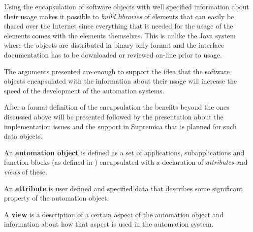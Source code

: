 Using the encapsulation of software objects with well
specified information about their usage makes it possible to
\textit{build libraries} of elements that can easily be
shared over the Internet since everything that is needed for
the usage of the elements comes with the elements
themselves. This is unlike the Java system where the objects
are distributed in binary only format and the interface
documentation has to be downloaded or reviewed on-line prior
to usage.

The arguments presented are enough to support the idea that
the software objects encapsulated with the information about
their usage will increase the speed of the development of
the automation systems. 

After a formal definition of the encapsulation the benefits
beyond the ones discussed above will be presented followed
by the presentation about the implementation issues and the
support in Supremica that is planned for such data objects.






An \textbf{automation object} is defined as a set of
applications, subapplications and function blocks (as
defined in \cite{iec:614991:2000}) encapsulated with a
declaration of \textit{attributes} and \textit{views} of
these.

An \textbf{attribute} is user defined and specified data that
describes some significant property of the automation
object. 

A \textbf{view} is a description of a certain aspect of the
automation object and information about how that aspect is
used in the automation system.







